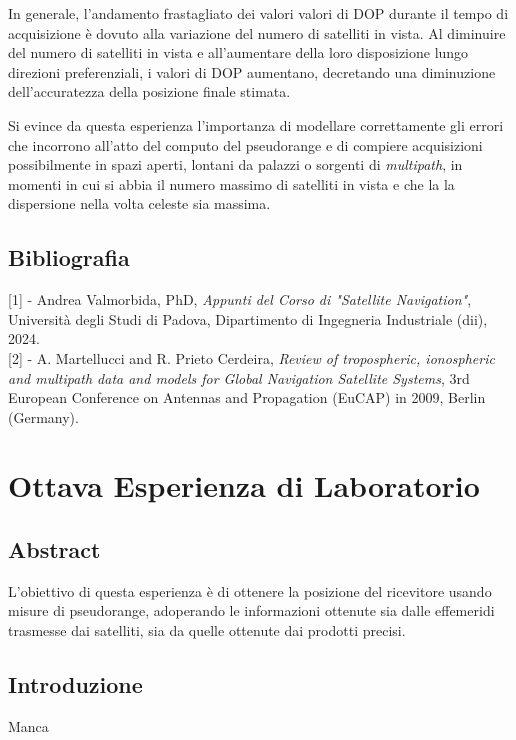 \documentclass[a4paper,11pt,twoside]{book}
\begin{document}
	In generale, l'andamento frastagliato dei valori valori di DOP durante il tempo di acquisizione è dovuto alla variazione del numero di satelliti in vista. Al diminuire del numero di satelliti in vista e all'aumentare della loro disposizione lungo direzioni preferenziali, i valori di DOP aumentano, decretando una diminuzione dell'accuratezza della posizione finale stimata.

	Si evince da questa esperienza l'importanza di modellare correttamente gli errori che incorrono all'atto del computo del pseudorange e di compiere acquisizioni possibilmente in spazi aperti, lontani da palazzi o sorgenti di \textit{multipath}, in momenti in cui si abbia il numero massimo di satelliti in vista e che la la dispersione nella volta celeste sia massima.

	\section{Bibliografia}
	
	[1] - Andrea Valmorbida, PhD, \textit{Appunti del Corso di "Satellite Navigation"}, Università degli Studi di Padova, Dipartimento di Ingegneria Industriale (dii), 2024.\\
	
	[2] - A. Martellucci and R. Prieto Cerdeira, \textit{Review of tropospheric, ionospheric and multipath data and models for Global Navigation Satellite Systems}, 3rd European Conference on Antennas and Propagation (EuCAP) in 2009, Berlin (Germany).
	

	\chapter{Ottava Esperienza di Laboratorio}
	
	\section{Abstract}
	
	L'obiettivo di questa esperienza è di ottenere la posizione del ricevitore usando misure di pseudorange, adoperando le informazioni ottenute sia dalle effemeridi trasmesse dai satelliti, sia da quelle ottenute dai prodotti precisi.
	
	\section{Introduzione}
	
	Manca
	
\end{document}
